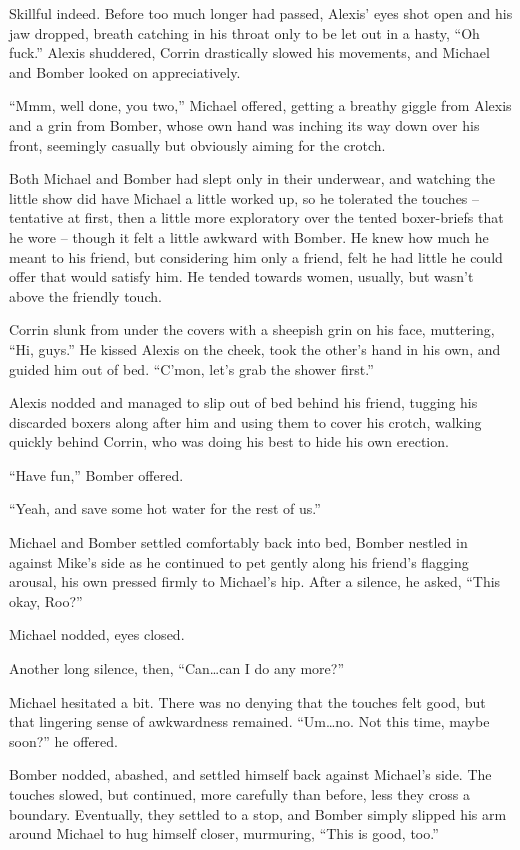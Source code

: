 Skillful indeed.  Before too much longer had passed, Alexis' eyes shot open and his jaw dropped, breath catching in his throat only to be let out in a hasty, ``Oh fuck.''  Alexis shuddered, Corrin drastically slowed his movements, and Michael and Bomber looked on appreciatively.

``Mmm, well done, you two,'' Michael offered, getting a breathy giggle from Alexis and a grin from Bomber, whose own hand was inching its way down over his front, seemingly casually but obviously aiming for the crotch.

Both Michael and Bomber had slept only in their underwear, and watching the little show did have Michael a little worked up, so he tolerated the touches -- tentative at first, then a little more exploratory over the tented boxer-briefs that he wore -- though it felt a little awkward with Bomber.  He knew how much he meant to his friend, but considering him only a friend, felt he had little he could offer that would satisfy him. He tended towards women, usually, but wasn't above the friendly touch.

Corrin slunk from under the covers with a sheepish grin on his face, muttering, ``Hi, guys.''  He kissed Alexis on the cheek, took the other's hand in his own, and guided him out of bed.  ``C'mon, let's grab the shower first.''

Alexis nodded and managed to slip out of bed behind his friend, tugging his discarded boxers along after him and using them to cover his crotch, walking quickly behind Corrin, who was doing his best to hide his own erection.

``Have fun,'' Bomber offered.

``Yeah, and save some hot water for the rest of us.''

Michael and Bomber settled comfortably back into bed, Bomber nestled in against Mike's side as he continued to pet gently along his friend's flagging arousal, his own pressed firmly to Michael's hip.  After a silence, he asked, ``This okay, Roo?''

Michael nodded, eyes closed.

Another long silence, then, ``Can\ldots{}can I do any more?''

Michael hesitated a bit.  There was no denying that the touches felt good, but that lingering sense of awkwardness remained.  ``Um\ldots{}no.  Not this time, maybe soon?'' he offered.

Bomber nodded, abashed, and settled himself back against Michael's side.  The touches slowed, but continued, more carefully than before, less they cross a boundary.  Eventually, they settled to a stop, and Bomber simply slipped his arm around Michael to hug himself closer, murmuring, ``This is good, too.''

